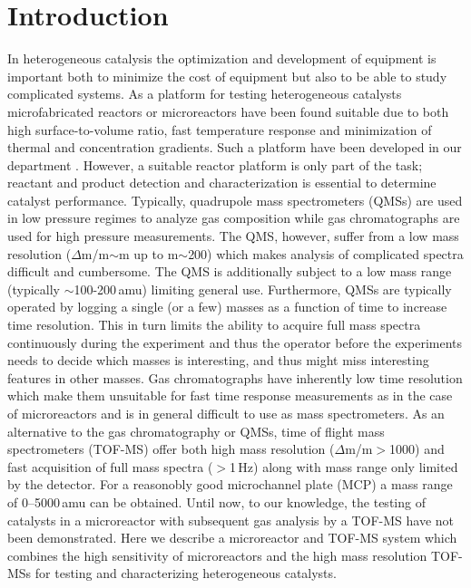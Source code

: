 \documentclass[aip,rsi]{revtex4-1}
\begin{document}
\pacs{}%

\maketitle %

\section{Introduction}
In heterogeneous catalysis the optimization and development of equipment is important both to minimize the cost of equipment but also to be able to study complicated systems. As a platform for testing heterogeneous catalysts microfabricated reactors or microreactors have been found suitable due to both high surface-to-volume ratio, fast temperature response and minimization of thermal and concentration gradients. Such a platform have been developed in our department \cite{Henriksen2009}. However, a suitable reactor platform is only part of the task; reactant and product detection and characterization is essential to determine catalyst performance. Typically, quadrupole mass spectrometers (QMSs) are used in low pressure regimes to analyze gas composition while gas chromatographs are used for high pressure measurements. The QMS, however, suffer from a low mass resolution ($\Delta$m/m$\sim$m up to m$\sim$200) which makes analysis of complicated spectra difficult and cumbersome. The QMS is additionally subject to a low mass range (typically $\sim$100-200\,amu) limiting general use. Furthermore, QMSs are typically operated by logging a single (or a few) masses as a function of time to increase time resolution. This in turn limits the ability to acquire full mass spectra continuously during the experiment and thus the operator before the experiments needs to decide which masses is interesting, and thus might miss interesting features in other masses. Gas chromatographs have inherently low time resolution which make them unsuitable for fast time response measurements as in the case of microreactors and is in general difficult to use as mass spectrometers. As an alternative to the gas chromatography or QMSs, time of flight mass spectrometers (TOF-MS) offer both high mass resolution ($\Delta$m/m$>$1000) and fast acquisition of full mass spectra ($>$1\,Hz) along with mass range only limited by the detector. For a reasonobly good microchannel plate (MCP) a mass range of 0--5000\,amu can be obtained. Until now, to our knowledge, the testing of catalysts in a microreactor with subsequent gas analysis by a TOF-MS have not been demonstrated. Here we describe a microreactor and TOF-MS system which combines the high sensitivity of microreactors and the high mass resolution TOF-MSs for testing and characterizing heterogeneous catalysts.
\end{document}

